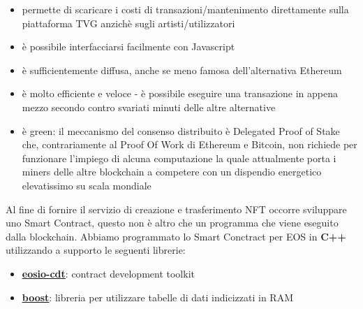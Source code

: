 \begin{itemize}
	\item permette di scaricare i costi di transazioni/mantenimento direttamente sulla piattaforma TVG anzichè sugli artisti/utilizzatori
	\item è possibile interfacciarsi facilmente con Javascript
	\item è sufficientemente diffusa, anche se meno famosa dell'alternativa Ethereum
	\item è molto efficiente e veloce - è possibile eseguire una transazione in appena mezzo secondo contro svariati minuti delle altre alternative
	\item è green: il meccanismo del consenso distribuito è Delegated Proof of Stake che, contrariamente al Proof Of Work di Ethereum e Bitcoin, non richiede per funzionare l'impiego di alcuna computazione la quale attualmente porta i miners delle altre blockchain a competere con un dispendio energetico elevatissimo su scala mondiale
\end{itemize}

Al fine di fornire il servizio di creazione e trasferimento NFT occorre sviluppare uno Smart Contract, questo non è altro che un programma che viene eseguito dalla blockchain.
Abbiamo programmato lo Smart Conctract per EOS in \textbf{C++} utilizzando a supporto le seguenti librerie:

\begin{itemize}
	\item \textbf{\underline{\href{https://developers.eos.io/welcome/latest/getting-started-guide/local-development-environment/installing-eosiocdt}{eosio-cdt}}}: contract development toolkit
	\item \textbf{\underline{\href{https://www.boost.org/}{boost}}}: libreria per utilizzare tabelle di dati indicizzati in RAM
\end{itemize}